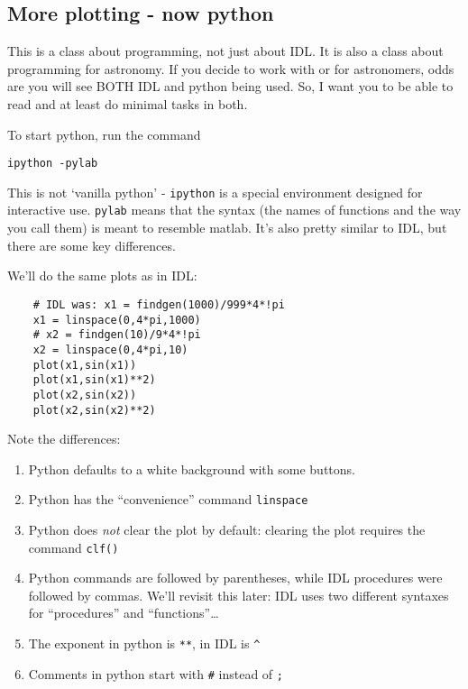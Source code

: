 \documentclass{article}
\begin{document}
\begin{spacing}{1.0}
\section{More plotting - now python}
This is a class about programming, not just about IDL.  It is also a class
about programming for astronomy.  If you decide to work with or for
astronomers, odds are you will see BOTH IDL and python being used.  So, I want
you to be able to read and at least do minimal tasks in both.

To start python, run the command

\verb|ipython -pylab|

This is not `vanilla python' - \texttt{ipython} is a special environment
designed for interactive use.  \texttt{pylab} means that the syntax (the names
of functions and the way you call them) is meant to resemble matlab.  It's also
pretty similar to IDL, but there are some key differences.

We'll do the same plots as in IDL:

\begin{lstlisting}
    # IDL was: x1 = findgen(1000)/999*4*!pi
    x1 = linspace(0,4*pi,1000) 
    # x2 = findgen(10)/9*4*!pi
    x2 = linspace(0,4*pi,10) 
    plot(x1,sin(x1))
    plot(x1,sin(x1)**2)
    plot(x2,sin(x2))
    plot(x2,sin(x2)**2)
\end{lstlisting}

Note the differences:
\begin{enumerate}
    \item Python defaults to a white background with some buttons.  
    \item Python has the ``convenience'' command \verb|linspace|
    \item Python does \emph{not} clear the plot by default: clearing the plot
        requires the command \verb|clf()|
    \item Python commands are followed by parentheses, while IDL procedures
        were followed by commas.  We'll revisit this later: IDL uses two
        different syntaxes for ``procedures'' and ``functions''\dots
    \item The exponent in python is \verb|**|, in IDL is \verb|^|
    \item Comments in python start with \verb|#| instead of \verb|;|
\end{enumerate}

\end{spacing}
\end{document}
